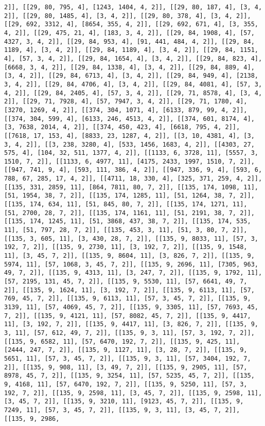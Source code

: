 \documentclass[12pt,fleqn]{article}\usepackage{../../common}
\begin{document}
\begin{verbatim}
2]], [[29, 80, 795, 4], [1243, 1404, 4, 2]], [[29, 80, 187, 4], [3, 4, 2]], [[29, 80, 1485, 4], [3, 4, 2]], [[29, 80, 378, 4], [3, 4, 2]], [[29, 692, 3312, 4], [8654, 355, 4, 2]], [[29, 692, 671, 4], [3, 355, 4, 2]], [[29, 475, 21, 4], [183, 3, 4, 2]], [[29, 84, 1908, 4], [57, 4327, 3, 4, 2]], [[29, 84, 953, 4], [91, 441, 484, 4, 2]], [[29, 84, 1189, 4], [3, 4, 2]], [[29, 84, 1189, 4], [3, 4, 2]], [[29, 84, 1151, 4], [57, 3, 4, 2]], [[29, 84, 1654, 4], [3, 4, 2]], [[29, 84, 823, 4], [6668, 3, 4, 2]], [[29, 84, 1338, 4], [3, 4, 2]], [[29, 84, 889, 4], [3, 4, 2]], [[29, 84, 6713, 4], [3, 4, 2]], [[29, 84, 949, 4], [2138, 3, 4, 2]], [[29, 84, 4706, 4], [3, 4, 2]], [[29, 84, 4081, 4], [57, 3, 4, 2]], [[29, 84, 2405, 4], [57, 3, 4, 2]], [[29, 71, 8578, 4], [3, 4, 2]], [[29, 71, 7928, 4], [57, 7947, 3, 4, 2]], [[29, 71, 1780, 4], [3270, 1269, 4, 2]], [[374, 304, 1071, 4], [6133, 879, 99, 4, 2]], [[374, 304, 599, 4], [6133, 246, 4513, 4, 2]], [[374, 601, 8174, 4], [3, 7638, 2014, 4, 2]], [[374, 450, 423, 4], [6618, 795, 4, 2]], [[7618, 17, 153, 4], [8833, 23, 1287, 4, 2]], [[3, 10, 4381, 4], [3, 3, 4, 2]], [[3, 238, 3280, 4], [533, 1456, 1683, 4, 2]], [[4303, 27, 575, 4], [104, 32, 511, 1377, 4, 2]], [[1133, 6, 3728, 11], [5557, 3, 1510, 7, 2]], [[1133, 6, 4977, 11], [4175, 2433, 1997, 1510, 7, 2]], [[947, 741, 9, 4], [593, 111, 386, 4, 2]], [[947, 336, 9, 4], [593, 6, 788, 67, 285, 17, 4, 2]], [[4711, 18, 330, 4], [325, 371, 259, 4, 2]], [[135, 331, 2859, 11], [864, 7811, 80, 7, 2]], [[135, 174, 1098, 11], [51, 1954, 38, 7, 2]], [[135, 174, 1285, 11], [51, 1264, 38, 7, 2]], [[135, 174, 634, 11], [51, 845, 80, 7, 2]], [[135, 174, 1271, 11], [51, 2700, 28, 7, 2]], [[135, 174, 1161, 11], [51, 2191, 38, 7, 2]], [[135, 174, 1245, 11], [51, 3868, 437, 38, 7, 2]], [[135, 174, 535, 11], [51, 797, 28, 7, 2]], [[135, 453, 3, 11], [51, 3, 80, 7, 2]], [[135, 3, 605, 11], [3, 430, 28, 7, 2]], [[135, 9, 8033, 11], [57, 3, 192, 7, 2]], [[135, 9, 2730, 11], [3, 192, 7, 2]], [[135, 9, 1548, 11], [3, 45, 7, 2]], [[135, 9, 8604, 11], [3, 826, 7, 2]], [[135, 9, 5974, 11], [57, 1068, 3, 45, 7, 2]], [[135, 9, 2696, 11], [7305, 963, 49, 7, 2]], [[135, 9, 4313, 11], [3, 247, 7, 2]], [[135, 9, 1792, 11], [57, 2195, 131, 45, 7, 2]], [[135, 9, 5530, 11], [57, 6641, 49, 7, 2]], [[135, 9, 1624, 11], [3, 192, 7, 2]], [[135, 9, 6113, 11], [57, 769, 45, 7, 2]], [[135, 9, 6113, 11], [57, 3, 45, 7, 2]], [[135, 9, 3139, 11], [57, 4069, 45, 7, 2]], [[135, 9, 3305, 11], [57, 7693, 45, 7, 2]], [[135, 9, 4121, 11], [57, 8082, 45, 7, 2]], [[135, 9, 4417, 11], [3, 192, 7, 2]], [[135, 9, 4417, 11], [3, 826, 7, 2]], [[135, 9, 3, 11], [57, 612, 49, 7, 2]], [[135, 9, 3, 11], [57, 3, 192, 7, 2]], [[135, 9, 6582, 11], [57, 6470, 192, 7, 2]], [[135, 9, 425, 11], [2444, 247, 7, 2]], [[135, 9, 1127, 11], [3, 28, 7, 2]], [[135, 9, 5651, 11], [57, 3, 45, 7, 2]], [[135, 9, 3, 11], [57, 3404, 192, 7, 2]], [[135, 9, 908, 11], [3, 49, 7, 2]], [[135, 9, 2905, 11], [57, 8978, 45, 7, 2]], [[135, 9, 3254, 11], [57, 5235, 45, 7, 2]], [[135, 9, 4168, 11], [57, 6470, 192, 7, 2]], [[135, 9, 5250, 11], [57, 3, 192, 7, 2]], [[135, 9, 2598, 11], [3, 45, 7, 2]], [[135, 9, 2598, 11], [3, 45, 7, 2]], [[135, 9, 3210, 11], [9123, 45, 7, 2]], [[135, 9, 7249, 11], [57, 3, 45, 7, 2]], [[135, 9, 3, 11], [3, 45, 7, 2]], [[135, 9, 2986, 
\end{verbatim}
\end{document}

